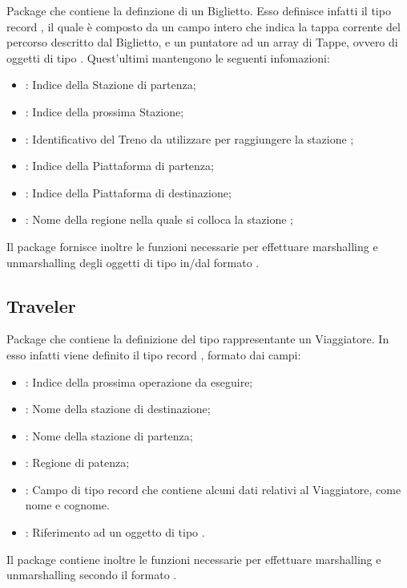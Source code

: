 	Package che contiene la definzione di un Biglietto. Esso definisce infatti il tipo record , il quale è composto da un campo intero  che indica la tappa corrente del percorso descritto dal Biglietto, e un puntatore ad un array di Tappe, ovvero di oggetti di tipo . Quest'ultimi mantengono le seguenti infomazioni:
		\begin{itemize}
			\item {} : Indice della Stazione di partenza;
			\item {} : Indice della prossima Stazione;
			\item {} : Identificativo del Treno da utilizzare per raggiungere la stazione ;
			\item {} : Indice della Piattaforma di partenza;
			\item {} : Indice della Piattaforma di destinazione;
			\item {} : Nome della regione nella quale si colloca la stazione ;
		\end{itemize}
	Il package fornisce inoltre le funzioni necessarie per effettuare marshalling e unmarshalling degli oggetti di tipo  in/dal formato .
	
	\subsection{Traveler}
	
	Package che contiene la definizione del tipo rappresentante un Viaggiatore. In esso infatti viene definito il tipo record , formato dai campi:
		\begin{itemize}
			\item {} : Indice della prossima operazione da eseguire;
			\item {} : Nome della stazione di destinazione;
			\item {} : Nome della stazione di partenza;
			\item {} : Regione di patenza;
			\item {} : Campo di tipo record che contiene alcuni dati relativi al Viaggiatore, come nome e cognome.
			\item {} : Riferimento ad un oggetto di tipo .
		\end{itemize}
	Il package  contiene inoltre le funzioni necessarie per effettuare marshalling e unmarshalling secondo il formato .
	
